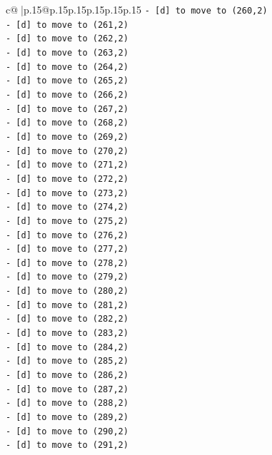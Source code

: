 \documentclass{article}
\begin{document}
{\begin{supertabular}{c@{$\;$}|p{.15\linewidth}@{}p{.15\linewidth}p{.15\linewidth}p{.15\linewidth}p{.15\linewidth}p{.15\linewidth}}
{{{\texttt{{-} {[}d{]} to move to (260,2)} \\
\texttt{{-} {[}d{]} to move to (261,2)} \\
\texttt{{-} {[}d{]} to move to (262,2)} \\
\texttt{{-} {[}d{]} to move to (263,2)} \\
\texttt{{-} {[}d{]} to move to (264,2)} \\
\texttt{{-} {[}d{]} to move to (265,2)} \\
\texttt{{-} {[}d{]} to move to (266,2)} \\
\texttt{{-} {[}d{]} to move to (267,2)} \\
\texttt{{-} {[}d{]} to move to (268,2)} \\
\texttt{{-} {[}d{]} to move to (269,2)} \\
\texttt{{-} {[}d{]} to move to (270,2)} \\
\texttt{{-} {[}d{]} to move to (271,2)} \\
\texttt{{-} {[}d{]} to move to (272,2)} \\
\texttt{{-} {[}d{]} to move to (273,2)} \\
\texttt{{-} {[}d{]} to move to (274,2)} \\
\texttt{{-} {[}d{]} to move to (275,2)} \\
\texttt{{-} {[}d{]} to move to (276,2)} \\
\texttt{{-} {[}d{]} to move to (277,2)} \\
\texttt{{-} {[}d{]} to move to (278,2)} \\
\texttt{{-} {[}d{]} to move to (279,2)} \\
\texttt{{-} {[}d{]} to move to (280,2)} \\
\texttt{{-} {[}d{]} to move to (281,2)} \\
\texttt{{-} {[}d{]} to move to (282,2)} \\
\texttt{{-} {[}d{]} to move to (283,2)} \\
\texttt{{-} {[}d{]} to move to (284,2)} \\
\texttt{{-} {[}d{]} to move to (285,2)} \\
\texttt{{-} {[}d{]} to move to (286,2)} \\
\texttt{{-} {[}d{]} to move to (287,2)} \\
\texttt{{-} {[}d{]} to move to (288,2)} \\
\texttt{{-} {[}d{]} to move to (289,2)} \\
\texttt{{-} {[}d{]} to move to (290,2)} \\
\texttt{{-} {[}d{]} to move to (291,2)} \\
}}}
\end{supertabular}}
\end{document}
